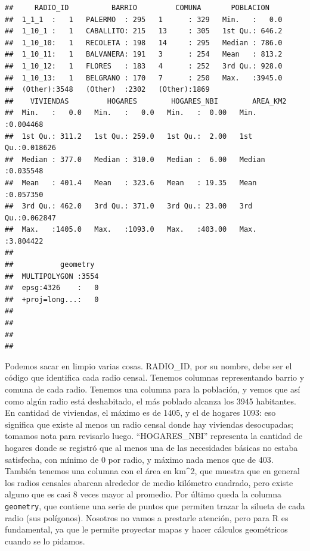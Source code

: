 \documentclass[spanish,]{book}
\begin{document}
\begin{verbatim}
##     RADIO_ID          BARRIO         COMUNA       POBLACION     
##  1_1_1  :   1   PALERMO  : 295   1      : 329   Min.   :   0.0  
##  1_10_1 :   1   CABALLITO: 215   13     : 305   1st Qu.: 646.2  
##  1_10_10:   1   RECOLETA : 198   14     : 295   Median : 786.0  
##  1_10_11:   1   BALVANERA: 191   3      : 254   Mean   : 813.2  
##  1_10_12:   1   FLORES   : 183   4      : 252   3rd Qu.: 928.0  
##  1_10_13:   1   BELGRANO : 170   7      : 250   Max.   :3945.0  
##  (Other):3548   (Other)  :2302   (Other):1869                   
##    VIVIENDAS         HOGARES        HOGARES_NBI        AREA_KM2       
##  Min.   :   0.0   Min.   :   0.0   Min.   :  0.00   Min.   :0.004468  
##  1st Qu.: 311.2   1st Qu.: 259.0   1st Qu.:  2.00   1st Qu.:0.018626  
##  Median : 377.0   Median : 310.0   Median :  6.00   Median :0.035548  
##  Mean   : 401.4   Mean   : 323.6   Mean   : 19.35   Mean   :0.057350  
##  3rd Qu.: 462.0   3rd Qu.: 371.0   3rd Qu.: 23.00   3rd Qu.:0.062847  
##  Max.   :1405.0   Max.   :1093.0   Max.   :403.00   Max.   :3.804422  
##                                                                       
##           geometry   
##  MULTIPOLYGON :3554  
##  epsg:4326    :   0  
##  +proj=long...:   0  
##                      
##                      
##                      
## 
\end{verbatim}

Podemos sacar en limpio varias cosas. RADIO\_ID, por su nombre, debe ser el código que identifica cada radio censal. Tenemos columnas representando barrio y comuna de cada radio. Tenemos una columna para la población, y vemos que así como algún radio está deshabitado, el más poblado alcanza los 3945 habitantes. En cantidad de viviendas, el máximo es de 1405, y el de hogares 1093: eso significa que existe al menos un radio censal donde hay viviendas desocupadas; tomamos nota para revisarlo luego. ``HOGARES\_NBI'' representa la cantidad de hogares donde se registró que al menos una de las necesidades básicas no estaba satisfecha, con mínimo de 0 por radio, y máximo nada menos que de 403. También tenemos una columna con el área en km\^{}2, que muestra que en general los radios censales abarcan alrededor de medio kilómetro cuadrado, pero existe alguno que es casi 8 veces mayor al promedio. Por último queda la columna \texttt{geometry}, que contiene una serie de puntos que permiten trazar la silueta de cada radio (sus polígonos). Nosotros no vamos a prestarle atención, pero para R es fundamental, ya que le permite proyectar mapas y hacer cálculos geométricos cuando se lo pidamos.
\end{document}
